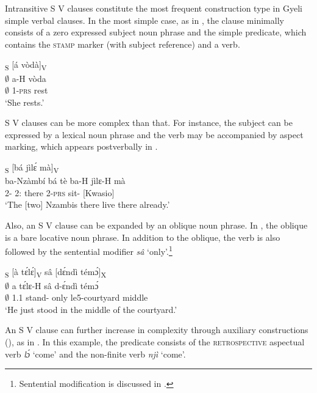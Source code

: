 Intransitive S V clauses constitute the most frequent construction type in Gyeli simple verbal clauses.
In the most simple case, as in , the clause minimally consists of a zero expressed subject noun phrase and the simple predicate, which contains the \textsc{stamp} marker (with subject reference) and a verb.

\ea\label{SV1}
  \glll [$\emptyset$]\textsubscript{S} [á vòdà]\textsubscript{V} \\
	{\db}$\emptyset$ {\db}a-H vòda\\
        {\db}$\emptyset$  {\db}1-\textsc{prs} rest\\
    \trans `She rests.'
\z

S V clauses can be more complex than that. For instance, the subject can be expressed by a lexical noun phrase and the verb may be accompanied by aspect marking, which appears postverbally in .

\ea \label{SV2}
  \textsubscript{S} [bá jìlɛ́ mà]\textsubscript{V} \\
          {\db}ba-Nzàmbí bá tè {\db}ba-H jìlɛ-H mà \\
              {\db}2-{\PN} 2:{\ATT} there {\db}2-\textsc{prs} sit-{\R} {\COMPL}[Kwasio]   \\
    \trans `The [two] Nzambis there live there already.'
\z

Also, an S V clause can be expanded by an oblique noun phrase. In , the oblique is a bare locative noun phrase. In addition to the oblique, the verb is also followed by the sentential modifier {\itshape sâ} `only'.\footnote{Sentential modification is discussed in .}

\ea \label{SV3}
  \glll [$\emptyset$]\textsubscript{S}  [à tɛ́lɛ́]\textsubscript{V} sâ [dɛ́ndì témɔ́]\textsubscript{X} \\
       {\db}$\emptyset$  {\db}a tɛ́lɛ-H sâ {\db}d-ɛ́ndì témɔ́ \\
       {\db}$\emptyset$  {\db}1.{\PST}1 stand-{\R} only {\db}le5-courtyard middle\\
    \trans `He just stood in the middle of the courtyard.'
\z

An S V clause can further increase in complexity through auxiliary constructions (), as in .  In this example, the predicate consists of the \textsc{retrospective} aspectual verb {\itshape lɔ́} `come' and the non-finite verb {\itshape njì} `come'.

